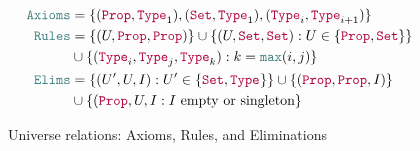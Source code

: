 \begin{figure}
\centering
\begin{align*}
\Axioms
    &= \set{(\Prop, \Type{1}), (\Set, \Type{1}), (\Type{i}, \Type{i+1})} \\
\Rules
    &= \set{(U, \Prop, \Prop)}
    \cup \set{(U, \Set, \Set) : U \in \set{\Prop, \Set}} \\
    &\cup \set{(\Type{i}, \Type{j}, \Type{k}) : k = \meta{max}(i, j)} \\
\Elims
    &= \set{(U', U, I) : U' \in \set{\Set, \Type{}}}
    \cup \set{(\Prop, \Prop, I)} \\
    &\cup \set{(\Prop, U, I : \text{$I$ empty or singleton}}
\end{align*}
\caption{Universe relations: Axioms, Rules, and Eliminations}
\label{fig:axruel}
\end{figure}

